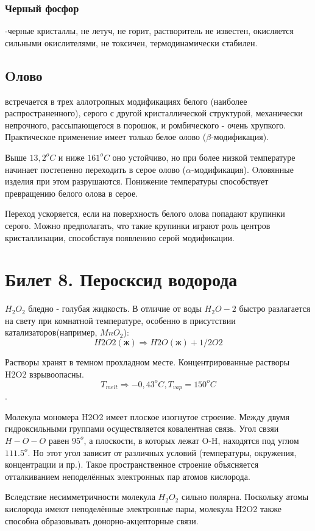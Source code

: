 \documentclass[11pt]{article}
\begin{document}
\subsubsection{Черный фосфор}-черные кристаллы, не летуч, не горит, растворитель не известен,
окисляется сильными окислителями, не токсичен, термодинамически стабилен.

\subsection{Oлово} встречается в трех аллотропных модификациях белого (наиболее
распространенного), серого с другой кристаллической структурой, механически
непрочного, рассыпающегося в порошок, и ромбического - очень хрупкого.
Практическое применение имеет только белое олово ($\beta$-модификация). 

Выше $13,2 ^o C$ и ниже $161^o C$ оно устойчиво, но при более низкой температуре начинает
постепенно переходить в серое олово ($\alpha$-модификация). Oловянные изделия при
этом разрушаются. Понижение температуры способствует превращению белого
олова в серое. 

Переход ускоряется, если на поверхность белого олова попадают
крупинки серого. Mожно предполагать, что такие крупинки играют роль центров
кристаллизации, способствуя появлению серой модификации.


\section{Билет 8. Перосксид водорода}

$H_2O_2$ бледно - голубая жидкость. В отличие от воды $H_2O-2$ быстро разлагается на свету при
комнатной температуре, особенно в присутствии катализаторов(например, $MnO_2$):
$$H2O2( ж) \Rightarrow H2O (ж) + 1/2 O2$$ 

Растворы хранят в темном прохладном месте. Концентрированные растворы H2O2 взрывоопасны. $$T_{melt}\Rightarrow-0,43 ^oC, T_{vap}=150^oC$$.

Молекула мономера H2O2 имеет плоское изогнутое строение. Между двумя
гидроксильными группами осуществляется ковалентная связь. Угол свзяи $H-O-O$ равен $95^o$,
а плоскости, в которых лежат O-H, находятся под углом $111.5^o$. Hо этот угол зависит от
различных условий (температуры, окружения, концентрации и пр.). Такое пространственное
строение объясняется отталкиванием неподелённых электронных пар атомов кислорода.


Вследствие несимметричности молекула $H_2O_2$ сильно полярна. Поскольку атомы кислорода
имеют неподелённые электронные пары, молекула H2O2 также способна образовывать
донорно-акцепторные связи.
\end{document}
